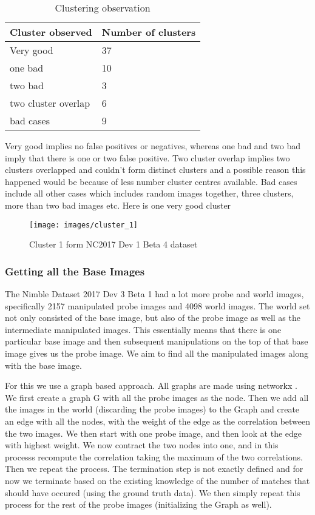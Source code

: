 \documentclass{article}
\begin{document}
\begin{table}[H]
\centering
\caption{Clustering observation}
\label{my-label}
\begin{tabular}{|l|l|}
  \hline
  Cluster observed    & Number of clusters \\
  \hline
  Very good              & 37                 \\
  one bad             & 10                 \\
  two bad             & 3                  \\
  two cluster overlap & 6                  \\
  bad cases           & 9                 \\
  \hline
\end{tabular}
\end{table}
Very good implies no false positives or negatives, whereas one bad and two bad imply that there is one or two false positive. Two cluster overlap implies two clusters overlapped and couldn't form distinct clusters and a possible reason this happened would be because of less number cluster centres available. Bad cases include all other cases which includes random images together, three clusters, more than two bad images etc. Here is one very good cluster

\begin{figure}[H]
  \centering
  \texttt{[image: images/cluster\_1]}
  \caption{Cluster 1 form NC2017 Dev 1 Beta 4 dataset}
  \label{fig:cluster}
\end{figure}

\subsubsection{Getting all the Base Images}
The Nimble Dataset 2017 Dev 3 Beta 1 had a lot more probe and world images, specifically 2157 manipulated probe images and 4098 world images. The world set not only consisted of the base image, but also of the probe image as well as the intermediate manipulated images. This essentially means that there is one particular base image and then subsequent manipulations on the top of that base image gives us the probe image. We aim to find all the manipulated images along with the base image.

For this we use a graph based approach. All graphs are made using networkx \cite{hagberg-2008-exploring}. We first create a graph G with all the probe images as the node. Then we add all the images in the world (discarding the probe images) to the Graph and create an edge with all the nodes, with the weight of the edge as the correlation between the two images. We then start with one probe image, and then look at the edge with highest weight. We now contract the two nodes into one, and in this processs recompute the correlation taking the maximum of the two correlations. Then we repeat the process. The termination step is not exactly defined and for now we terminate based on the existing knowledge of the number of matches that should have occured (using the ground truth data). We then simply repeat this process for the rest of the probe images (initializing the Graph as well).
\end{document}
